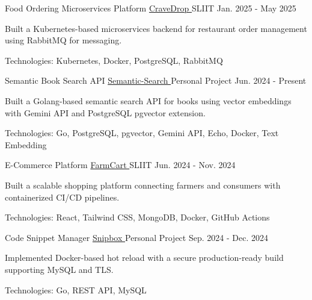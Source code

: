 
\begin{cventries}

  \cventry
    {Food Ordering Microservices Platform}
    {\href{https://github.com/nmdra/CraveDrop}{CraveDrop \faGithub}}
    {SLIIT}
    {Jan. 2025 - May 2025}
    {
      \begin{cvitems}
        \item {Built a Kubernetes-based microservices backend for restaurant order management using RabbitMQ for messaging.}
        \item {Technologies: Kubernetes, Docker, PostgreSQL, RabbitMQ}
      \end{cvitems}
    }

  \cventry
   {Semantic Book Search API}
   {\href{https://github.com/nmdra/Semantic-Search}{Semantic-Search \faGithub}}
   {Personal Project}
   {Jun. 2024 - Present}
   {
      \begin{cvitems}
        \item {Built a Golang-based semantic search API for books using vector embeddings with Gemini API and PostgreSQL pgvector extension.}
        \item {Technologies: Go, PostgreSQL, pgvector, Gemini API, Echo, Docker, Text Embedding}
      \end{cvitems}
   }

  \cventry
    {E-Commerce Platform}
    {\href{https://github.com/nmdra/FarmCart}{FarmCart \faGithub}}
    {SLIIT}
    {Jun. 2024 - Nov. 2024}
    {
      \begin{cvitems}
        \item {Built a scalable shopping platform connecting farmers and consumers with containerized CI/CD pipelines.}
        \item {Technologies: React, Tailwind CSS, MongoDB, Docker, GitHub Actions}
      \end{cvitems}
    }

  \cventry
    {Code Snippet Manager}
    {\href{https://github.com/nmdra/snipbox}{Snipbox \faGithub}}
    {Personal Project}
    {Sep. 2024 - Dec. 2024}
    {
      \begin{cvitems}
        \item {Implemented Docker-based hot reload with a secure production-ready build supporting MySQL and TLS.}
        \item {Technologies: Go, REST API, MySQL}
      \end{cvitems}
    }


\end{cventries}
